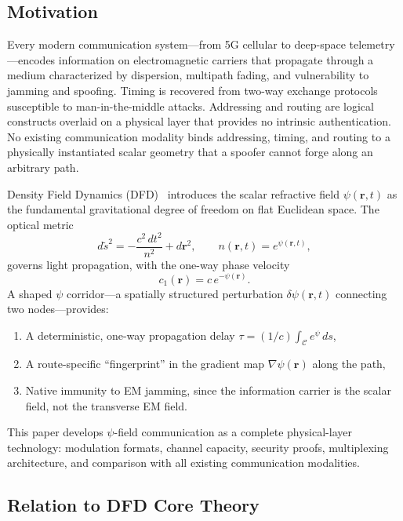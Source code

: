 \documentclass[twocolumn,superscriptaddress,prd,nofootinbib]{revtex4-2}
\newcommand{\Corridor}{\mathcal{C}}
\begin{document}
\subsection{Motivation}

Every modern communication system---from 5G cellular to deep-space
telemetry---encodes information on electromagnetic carriers that
propagate through a medium characterized by dispersion, multipath
fading, and vulnerability to jamming and spoofing.
Timing is recovered from two-way exchange protocols susceptible to
man-in-the-middle attacks.
Addressing and routing are logical constructs overlaid on a physical
layer that provides no intrinsic authentication.
No existing communication modality binds addressing, timing, and
routing to a physically instantiated scalar geometry that a spoofer
cannot forge along an arbitrary path.

Density Field Dynamics (DFD)~\cite{Alcock2025DFD} introduces the
scalar refractive field $\psi(\mathbf{r},t)$ as the fundamental
gravitational degree of freedom on flat Euclidean space.
The optical metric
\begin{equation}
d\tilde{s}^2 = -\frac{c^2\,dt^2}{n^2} + d\mathbf{r}^2, \qquad
n(\mathbf{r},t) = e^{\psi(\mathbf{r},t)},
\label{eq:optical-metric}
\end{equation}
governs light propagation, with the one-way phase velocity
\begin{equation}
c_1(\mathbf{r}) = c\,e^{-\psi(\mathbf{r})}.
\label{eq:c1}
\end{equation}
A shaped $\psi$ corridor---a spatially structured perturbation
$\delta\psi(\mathbf{r},t)$ connecting two nodes---provides:
\begin{enumerate}[label=(\roman*)]
\item A deterministic, one-way propagation delay
$\tau = (1/c)\int_{\Corridor} e^\psi\,ds$,
\item A route-specific ``fingerprint'' in the gradient map
$\nabla\psi(\mathbf{r})$ along the path,
\item Native immunity to EM jamming, since the information carrier is
the scalar field, not the transverse EM field.
\end{enumerate}

This paper develops $\psi$-field communication as a complete
physical-layer technology: modulation formats, channel capacity,
security proofs, multiplexing architecture, and comparison with all
existing communication modalities.

\subsection{Relation to DFD Core Theory}
\end{document}
